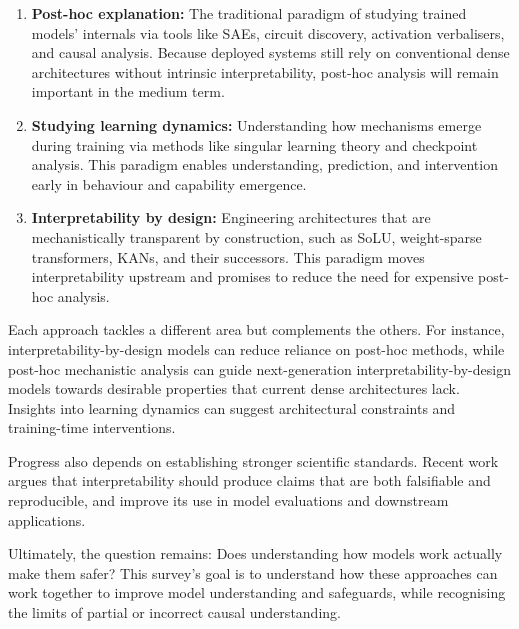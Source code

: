 \begin{enumerate}
    \item \textbf{Post-hoc explanation:} The traditional paradigm of studying trained models' internals via tools like SAEs, circuit discovery, activation verbalisers, and causal analysis. Because deployed systems still rely on conventional dense architectures without intrinsic interpretability, post-hoc analysis will remain important in the medium term.

    \item \textbf{Studying learning dynamics:} Understanding how mechanisms emerge during training via methods like singular learning theory and checkpoint analysis. This paradigm enables understanding, prediction, and intervention early in behaviour and capability emergence.

    \item \textbf{Interpretability by design:} Engineering architectures that are mechanistically transparent by construction, such as SoLU, weight-sparse transformers, KANs, and their successors. This paradigm moves interpretability upstream and promises to reduce the need for expensive post-hoc analysis.
\end{enumerate}

Each approach tackles a different area but complements the others. For instance, interpretability-by-design models can reduce reliance on post-hoc methods, while post-hoc mechanistic analysis can guide next-generation interpretability-by-design models towards desirable properties that current dense architectures lack. Insights into learning dynamics can suggest architectural constraints and training-time interventions.

Progress also depends on establishing stronger scientific standards. Recent work argues that interpretability should produce claims that are both falsifiable and reproducible, and improve its use in model evaluations and downstream applications.

Ultimately, the question remains: Does understanding how models work actually make them safer? This survey's goal is to understand how these approaches can work together to improve model understanding and safeguards, while recognising the limits of partial or incorrect causal understanding.
